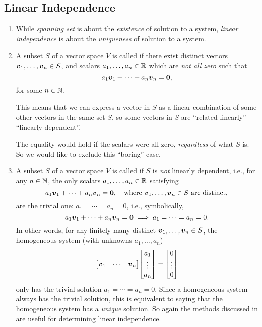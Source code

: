 \subsection{Linear Independence}
\begin{enumerate}
\item While \emph{spanning set} is about the \emph{existence} of solution to a
system, \emph{linear independence} is about the \emph{uniqueness} of solution
to a system.

\item A subset \(S\) of a vector space \(V\) is called  if there exist distinct vectors \(\vb*{v}_1,\dotsc,\vb*{v}_n\in
S\), and scalars \(a_1,\dotsc,a_n\in\mathbb{R}\) which are \emph{not all zero} such that
\[
a_1\vb*{v}_1+\dotsb+a_n\vb*{v}_n=\vb*{0},
\]
for some \(n\in\mathbb{N}\).
\begin{intuition}
This means that we can express a vector in \(S\) as a linear combination of
some other vectors in the same set \(S\), so some vectors in \(S\) are
``related linearly''  ``linearly dependent''.

The equality would hold if the scalars were all zero, \emph{regardless} of what
\(S\) is. So we would like to exclude this ``boring'' case.
\end{intuition}

\item A subset \(S\) of a vector space \(V\) is called  if \(S\) is \emph{not} linearly dependent, i.e., for any
\(n\in\mathbb{N}\), the only scalars \(a_1,\dotsc,a_n\in\mathbb{R}\) satisfying
\[
a_1\vb*{v}_1+\dotsb+a_n\vb*{v}_n=\vb*{0},\quad\text{where
\(\vb*{v}_1,\dotsc,\vb*{v}_n\in S\) are distinct},
\]
are the trivial one: \(a_1=\dotsb=a_n=0\), i.e., symbolically,
\[
a_1\vb*{v}_1+\dotsb+a_n\vb*{v}_n=\vb*{0}
\implies a_1=\dotsb=a_n=0.
\]
In other words, for any finitely
many distinct \(\vb*{v}_1,\dotsc,\vb*{v}_n\in S\), the homogeneous system
(with unknowns \(a_1,\dotsc,a_n\))
\[
\mqty[\vect{v}_1&\cdots&\vect{v}_n]\mqty[a_1\\\vdots\\ a_n]=\mqty[0\\\vdots\\ 0]
\]
only has the trivial solution \(a_1=\dotsb=a_n=0\). Since a homogeneous system
always has the trivial solution, this is equivalent to saying that the
homogeneous system has a \emph{unique} solution. So again the methods discussed
in  are useful for determining linear independence.


\end{enumerate}
